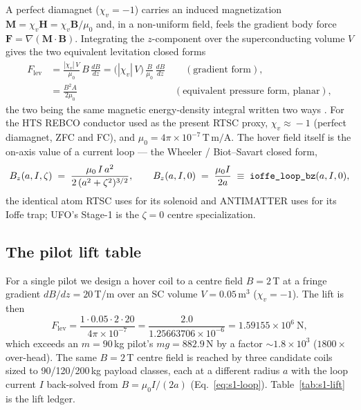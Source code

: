 A perfect diamagnet ($\chi_v=-1$) carries an induced magnetization
$\mathbf{M}=\chi_v\mathbf{H}=\chi_v\mathbf{B}/\mu_0$ and, in a
non-uniform field, feels the gradient body force
$\mathbf{F}=\nabla(\mathbf{M}\!\cdot\!\mathbf{B})$. Integrating the
$z$-component over the superconducting volume $V$ gives the two
equivalent levitation closed forms
\begin{align}
F_{\text{lev}}
  &= \frac{|\chi_v|\,V}{\mu_0}\,B\,\frac{dB}{dz}
   = \bigl(|\chi_v|\,V\bigr)\,\frac{B}{\mu_0}\,\frac{dB}{dz}
   \qquad(\text{gradient form}), \label{eq:s1-grad}\\
  &= \frac{B^2 A}{2\mu_0}
   \qquad\qquad\qquad\qquad\qquad(\text{equivalent pressure form, planar}),
   \label{eq:s1-press}
\end{align}
the two being the same magnetic energy-density integral written two ways
\citep{jackson1998}. For the HTS REBCO conductor used as the present
RTSC proxy, $\chi_v\!\approx\!-1$ (perfect diamagnet, ZFC and FC), and
$\mu_0=4\pi\times10^{-7}\,\text{T}\,\text{m}/\text{A}$. The hover field
itself is the on-axis value of a current loop --- the Wheeler /
Biot--Savart closed form,
\begin{equation}
B_z(a,I,\zeta) \;=\; \frac{\mu_0\,I\,a^2}{2\,(a^2+\zeta^2)^{3/2}},
\qquad
B_z(a,I,0) \;=\; \frac{\mu_0 I}{2a}\;\equiv\;\verb|ioffe_loop_bz|(a,I,0),
\label{eq:s1-loop}
\end{equation}
the identical atom RTSC uses for its solenoid and ANTIMATTER uses for
its Ioffe trap; UFO's Stage-1 is the $\zeta\!=\!0$ centre specialization.

\subsection{The pilot lift table}
\label{app:stage1-table}

For a single pilot we design a hover coil to a centre field $B=2$\,T at a
fringe gradient $dB/dz=20$\,T/m over an SC volume $V=0.05$\,m$^3$
($\chi_v=-1$). The lift is then
\begin{equation}
F_{\text{lev}}
 = \frac{1\cdot0.05\cdot2\cdot20}{4\pi\times10^{-7}}
 = \frac{2.0}{1.25663706\times10^{-6}}
 = 1.59155\times10^{6}\ \text{N},
\label{eq:s1-Flev}
\end{equation}
which exceeds an $m\!=\!90$\,kg pilot's $mg=882.9$\,N by a factor
$\sim\!1.8\times10^{3}$ ($1800\times$ over-head). The same $B=2$\,T centre
field is reached by three candidate coils sized to 90/120/200\,kg
payload classes, each at a different radius $a$ with the loop current $I$
back-solved from $B=\mu_0 I/(2a)$ (Eq.~\eqref{eq:s1-loop}).
Table~\ref{tab:s1-lift} is the lift ledger.

